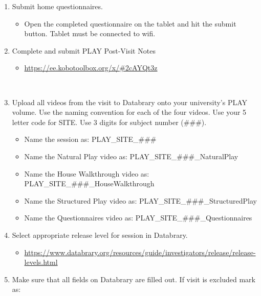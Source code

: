 \documentclass[
  12pt,
]{book}
\providecommand{\tightlist}{%
  \setlength{\itemsep}{0pt}\setlength{\parskip}{0pt}}
\begin{document}
\begin{enumerate}
\def\labelenumi{\arabic{enumi}.}
\tightlist
\item
  Submit home questionnaires.

  \begin{itemize}
  \tightlist
  \item
    Open the completed questionnaire on the tablet and hit the submit button. Tablet must be connected to wifi.\\
  \end{itemize}
\item
  Complete and submit PLAY Post-Visit Notes

  \begin{itemize}
  \tightlist
  \item
    \url{https://ee.kobotoolbox.org/x/\#2cAYQt3z}\strut \\
  \end{itemize}
\item
  Upload all videos from the visit to Databrary onto your university's PLAY volume.
  Use the naming convention for each of the four videos. Use your 5 letter code for SITE. Use 3 digits for subject number (\#\#\#).

  \begin{itemize}
  \tightlist
  \item
    Name the session as: PLAY\_SITE\_\#\#\#\\
  \item
    Name the Natural Play video as: PLAY\_SITE\_\#\#\#\_NaturalPlay\\
  \item
    Name the House Walkthrough video as: PLAY\_SITE\_\#\#\#\_HouseWalkthrough\\
  \item
    Name the Structured Play video as: PLAY\_SITE\_\#\#\#\_StructuredPlay\\
  \item
    Name the Questionnaires video as: PLAY\_SITE\_\#\#\#\_Questionnaires\\
  \end{itemize}
\item
  Select appropriate release level for session in Databrary.

  \begin{itemize}
  \tightlist
  \item
    \url{https://www.databrary.org/resources/guide/investigators/release/release-levels.html}
  \end{itemize}
\item
  Make sure that all fields on Databrary are filled out.
  If visit is excluded mark as:


\end{enumerate}
\end{document}

